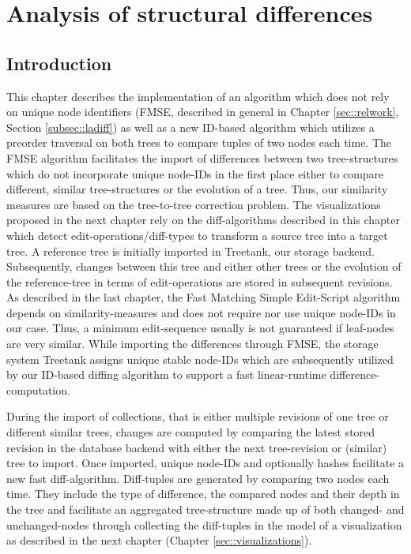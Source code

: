 \section{Analysis of structural differences}\label{sec::differences}
\subsection{Introduction}
This chapter describes the implementation of an algorithm which does not rely on unique node identifiers (FMSE, described in general in Chapter \ref{sec::relwork}, Section \ref{subsec::ladiff}) as well as a new ID-based algorithm which utilizes a preorder traversal on both trees to compare tuples of two nodes each time. The FMSE algorithm facilitates the import of differences between two tree-structures which do not incorporate unique node-IDs in the first place either to compare different, similar tree-structures or the evolution of a tree. Thus, our similarity measures are based on the tree-to-tree correction problem. The visualizations proposed in the next chapter rely on the diff-algorithms described in this chapter which detect edit-operations/diff-types to transform a source tree into a target tree. A reference tree is initially imported in Treetank, our storage backend. Subsequently, changes between this tree and either other trees or the evolution of the reference-tree in terms of edit-operations are stored in subsequent revisions. As described in the last chapter, the Fast Matching Simple Edit-Script algorithm depends on similarity-measures and does not require nor use unique node-IDs in our case. Thus, a minimum edit-sequence usually is not guaranteed if leaf-nodes are very similar. While importing the differences through FMSE, the storage system Treetank assigns unique stable node-IDs which are subsequently utilized by our ID-based diffing algorithm to support a fast linear-runtime difference-computation.

During the import of collections, that is either multiple revisions of one tree or different similar trees, changes are computed by comparing the latest stored revision in the database backend with either the next tree-revision or (similar) tree to import. Once imported, unique node-IDs and optionally hashes facilitate a new fast diff-algorithm. Diff-tuples are generated by comparing two nodes each time. They include the type of difference, the compared nodes and their depth in the tree and facilitate an aggregated tree-structure made up of both changed- and unchanged-nodes through collecting the diff-tuples in the model of a visualization as described in the next chapter (Chapter \ref{sec::visualizations}). 

